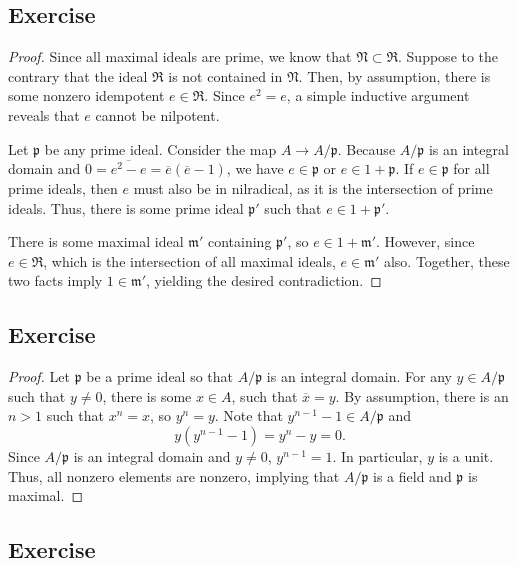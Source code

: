 \subsection{Exercise}\label{1.6}

\begin{proof}
Since all maximal ideals are prime, we know that $\mathfrak{N} \subset \mathfrak{R}$. Suppose to the contrary that the ideal
$\mathfrak{R}$ is not contained in $\mathfrak{N}$. Then, by assumption, there is some nonzero idempotent $e \in \mathfrak{R}$.
Since $e^2 = e$, a simple inductive argument reveals that $e$ cannot be nilpotent. 

Let $\mathfrak{p}$ be any prime ideal. Consider the map $A \to A/\mathfrak{p}$. Because $A/\mathfrak{p}$ is an integral domain and 
$0 = \overline{e^2 - e} = \overline{e}(\overline{e} - 1)$, we have $e \in \mathfrak{p}$ or $e \in 1 + \mathfrak{p}$. If $e \in \mathfrak{p}$
for all prime ideals, then $e$ must also be in nilradical, as it is the intersection of prime ideals. Thus, there is some prime ideal
$\mathfrak{p}'$ such that $e \in 1 + \mathfrak{p}'$.

There is some maximal ideal $\mathfrak{m}'$ containing $\mathfrak{p}'$, so $e \in 1 + \mathfrak{m}'$.
However, since $e \in \mathfrak{R}$, which is the intersection of all maximal ideals, $e \in \mathfrak{m}'$ also.
Together, these two facts imply $1 \in \mathfrak{m}'$, yielding the desired contradiction.
\end{proof}

\subsection{Exercise}\label{1.7}

\begin{proof}
Let $\mathfrak{p}$ be a prime ideal so that $A/\mathfrak{p}$ is an integral domain. For any $y \in A/\mathfrak{p}$
such that $y \neq 0$, there is some $x \in A$, such that $\overline{x} = y$. By assumption, there is an $n > 1$ 
such that $x^n = x$, so $y^n = y$. Note that $y^{n-1} - 1 \in A/\mathfrak{p}$ and 
$$y(y^{n-1} - 1) = y^n - y = 0.$$
Since $A/\mathfrak{p}$ is an integral domain and $y \neq 0$, $y^{n-1} = 1$. In particular, $y$ is a unit. Thus,
all nonzero elements are nonzero, implying that $A/\mathfrak{p}$ is a field and $\mathfrak{p}$ is maximal.
\end{proof}

\subsection{Exercise}\label{1.8}

